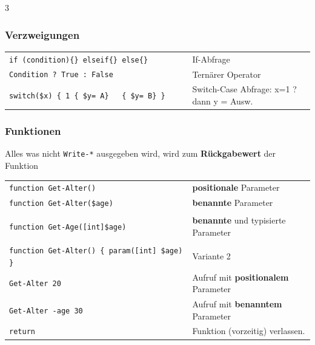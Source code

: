 \documentclass[
11pt,
footheight=40pt
]{scrartcl}
\newif \ifverzweigungen \verzweigungentrue
\newif \iffunctions \functionstrue
\begin{document}
\begin{paracol}{3}
	\ifverzweigungen 
	\subsubsection*{Verzweigungen}
	\begin{tabular}{p{0.6\linewidth} p{0.4\linewidth}}
	    \rowcolor{lightyellow} \texttt{if (condition)\{\} elseif\{\} else\{\}} & If-Abfrage \\
	    \texttt{Condition ? True : False} & Ternärer Operator \\
		\rowcolor{lightyellow} \texttt{switch(\$x)~\{ 1~\{~\$y= \dq A\dq\}~ \linebreak 2~\{~\$y= \dq B\dq\} \linebreak \} } & Switch-Case Abfrage: x=1 ? dann y = \dq A\dq usw. \\
		
	\end{tabular}
	\fi
	
	\switchcolumn	
	
	\iffunctions 
	\subsubsection*{Funktionen}
	Alles was nicht \texttt{Write-*} ausgegeben wird, wird zum \textbf{Rückgabewert} der Funktion \\
	\begin{tabular}{p{0.6\linewidth} p{0.4\linewidth}}
	\rowcolor{lightgreen} \texttt{function Get-Alter()} & \textbf{positionale} Parameter \\
	\texttt{function Get-Alter(\$age)} & \textbf{benannte} Parameter \\
	\rowcolor{lightgreen}\begin{footnotesize} \texttt{function Get-Age([int]\$age)} \end{footnotesize}& \textbf{benannte} und typisierte Parameter \\
	\texttt{function Get-Alter() \{ param([int] \$age) \}} & Variante 2 \\ \hline
	\rowcolor{lightgreen} \texttt{Get-Alter 20} & Aufruf mit \textbf{positionalem} Parameter \\
	\texttt{Get-Alter -age 30} & Aufruf mit \textbf{benanntem} Parameter \\ \hline
	\rowcolor{lightgreen} \texttt{return} & Funktion (vorzeitig) verlassen. \\
	\end{tabular}
	\fi
	

\end{paracol}
\end{document}
